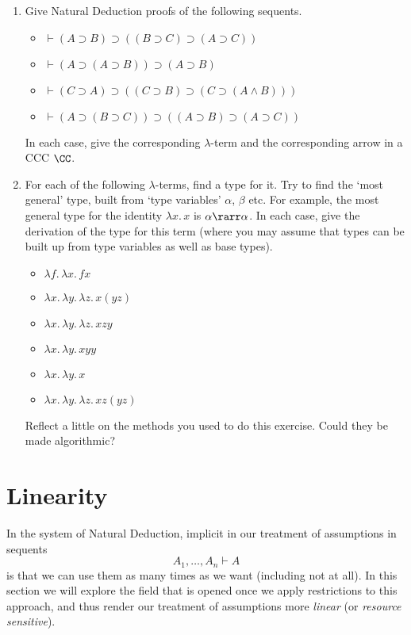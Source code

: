 \documentclass[12pt]{article}
\begin{document}
\begin{enumerate}\renewcommand{\theenumi}{\textbf{\arabic{enumi}}}
  \item Give Natural Deduction proofs of the following sequents.
    \begin{itemize}
    \item $\vdash (A \supset B) \supset ((B \supset C) \supset (A \supset C))$
    \item $\vdash (A \supset (A \supset B)) \supset (A \supset B)$
    \item $\vdash (C \supset A) \supset ((C \supset B) \supset (C \supset (A \wedge B)))$
    \item $\vdash (A \supset (B \supset C)) \supset ((A \supset B) \supset (A \supset C))$
    \end{itemize}
    In each case, give the corresponding $\lambda$-term and the corresponding arrow in a CCC $\CC$.
  \item For each of the following $\lambda$-terms, find a type for it. Try to find the `most general' type, built from `type variables' $\alpha$,
    $\beta$ etc. For example, the most general type for the identity $\lambda x. \, x$ is $\alpha \rarr \alpha$.
    In each case, give the derivation of the type for this term (where you may assume that types can be
    built up from type variables as well as base types).
    \begin{itemize}
      \item $\lambda f.\, \lambda x. \, fx$
      \item $ \lambda x. \, \lambda y. \, \lambda z. \, x (yz)$
      \item $ \lambda x . \, \lambda y. \, \lambda z. \, x z y$
      \item $ \lambda x.\, \lambda y.\, x y y$
      \item $ \lambda x.\, \lambda y.\, x$
      \item $ \lambda x. \, \lambda y.\, \lambda z. \, xz (yz)$
    \end{itemize}
    Reflect a little on the methods you used to do this exercise. Could they be made algorithmic?
\end{enumerate}

\section{Linearity}
In the system of Natural Deduction, implicit in our treatment of assumptions in sequents
\[ A_{1}, \ldots , A_{n} \vdash A \]
is that we can use them as many times as we want (including not at all). In this section we will explore the field that is opened once we apply
restrictions to this approach, and thus render our treatment of assumptions more \emph{linear} (or \emph{resource sensitive}).
\end{document}
